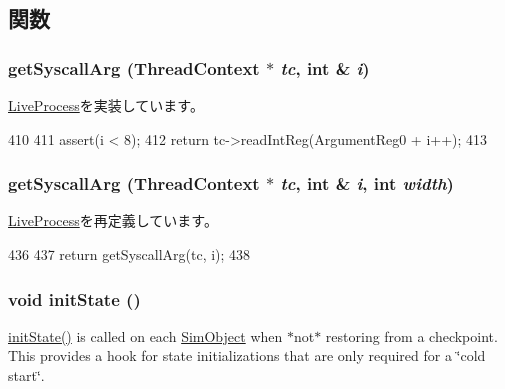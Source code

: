 \subsection{関数}
\hypertarget{classArmLiveProcess64_acd6c1a25855e6ca42789dd97c86a17ac}{
\subsubsection[{getSyscallArg}]{ getSyscallArg ({\bf ThreadContext} $\ast$ {\em tc}, \/  int \& {\em i})}}
\label{classArmLiveProcess64_acd6c1a25855e6ca42789dd97c86a17ac}


\hyperlink{classLiveProcess_aa001ff57ec460026facb89ba19c7bf96}{LiveProcess}を実装しています。


\begin{DoxyCode}
410 {
411     assert(i < 8);
412     return tc->readIntReg(ArgumentReg0 + i++);
413 }
\end{DoxyCode}
\hypertarget{classArmLiveProcess64_a52c7542cca5e7218361e5d1baf236cb2}{
\subsubsection[{getSyscallArg}]{ getSyscallArg ({\bf ThreadContext} $\ast$ {\em tc}, \/  int \& {\em i}, \/  int {\em width})}}
\label{classArmLiveProcess64_a52c7542cca5e7218361e5d1baf236cb2}


\hyperlink{classLiveProcess_a383f46521b8667b58a1275f2a3e2fda1}{LiveProcess}を再定義しています。


\begin{DoxyCode}
436 {
437     return getSyscallArg(tc, i);
438 }
\end{DoxyCode}
\hypertarget{classArmLiveProcess64_a3c34ea9b29f410748d4435a667484924}{
\subsubsection[{initState}]{\setlength{\rightskip}{0pt plus 5cm}void initState ()}}
\label{classArmLiveProcess64_a3c34ea9b29f410748d4435a667484924}
\hyperlink{classArmLiveProcess64_a3c34ea9b29f410748d4435a667484924}{initState()} is called on each \hyperlink{classSimObject}{SimObject} when $\ast$not$\ast$ restoring from a checkpoint. This provides a hook for state initializations that are only required for a \char`\"{}cold start\char`\"{}. 

